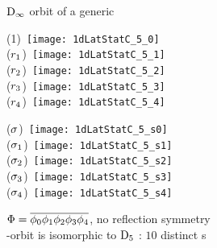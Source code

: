 \begin{frame} {$\textrm{D}_{\infty}$ orbit of a generic {\lattstate}}
\begin{center}
  \begin{minipage}[b]{0.17\textwidth}\begin{center}
{(1)}~\texttt{[image: 1dLatStatC\_5\_0]}
\\
{($r_{1}$)}~\texttt{[image: 1dLatStatC\_5\_1]}
\\
{($r_{2}$)}~\texttt{[image: 1dLatStatC\_5\_2]}
\\
{($r_{3}$)}~\texttt{[image: 1dLatStatC\_5\_3]}
\\
{($r_{4}$)}~\texttt{[image: 1dLatStatC\_5\_4]}
  \end{center}\end{minipage}
\qquad\quad
  \begin{minipage}[b]{0.17\textwidth}\begin{center}
{($\sigma$)}~\texttt{[image: 1dLatStatC\_5\_s0]}
\\
{($\sigma_1$)}~\texttt{[image: 1dLatStatC\_5\_s1]}
\\
{($\sigma_2$)}~\texttt{[image: 1dLatStatC\_5\_s2]}
\\
{($\sigma_3$)}~\texttt{[image: 1dLatStatC\_5\_s3]}
\\
{($\sigma_4$)}~\texttt{[image: 1dLatStatC\_5\_s4]}

  \end{center} \end{minipage}
  \end{center}
{\lattstate}
\(\Phi={\overline{\phi_0 \phi_1 \phi_2 \phi_3 \phi_4}}\),
no reflection symmetry
\\

\Dn{\infty}-orbit is isomorphic to $\textrm{D}_{5}$ : $10$ distinct {\lattstate}s
\end{frame} %

